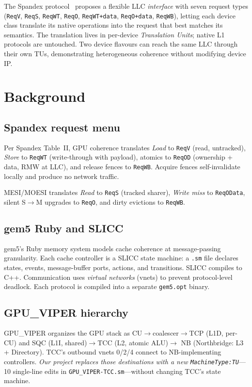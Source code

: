 \documentclass[conference,letterpaper,10pt]{IEEEtran}
\begin{document}
The Spandex protocol~\cite{spandex} proposes a flexible LLC
\emph{interface} with seven request types (\texttt{ReqV}, \texttt{ReqS},
\texttt{ReqWT}, \texttt{ReqO}, \texttt{ReqWT+data}, \texttt{ReqO+data},
\texttt{ReqWB}), letting each device class translate its native
operations into the request that best matches its semantics. The
translation lives in per-device \emph{Translation Units}; native L1
protocols are untouched. Two device flavours can reach the same LLC
through their own TUs, demonstrating heterogeneous coherence without
modifying device IP.

\section{Background}

\subsection{Spandex request menu}
Per Spandex Table~II, GPU coherence translates \emph{Load} to
\texttt{ReqV} (read, untracked), \emph{Store} to \texttt{ReqWT}
(write-through with payload), atomics to \texttt{ReqOD} (ownership +
data, RMW at LLC), and release fences to \texttt{ReqWB}. Acquire
fences self-invalidate locally and produce no network traffic.

MESI/MOESI translates \emph{Read} to \texttt{ReqS} (tracked sharer),
\emph{Write miss} to \texttt{ReqOData}, silent S$\to$M upgrades to
\texttt{ReqO}, and dirty evictions to \texttt{ReqWB}.

\subsection{gem5 Ruby and SLICC}
gem5's Ruby memory system models cache coherence at message-passing
granularity. Each cache controller is a SLICC state machine: a
\texttt{.sm} file declares states, events, message-buffer ports,
actions, and transitions. SLICC compiles to C++. Communication uses
\emph{virtual networks} (vnets) to prevent protocol-level deadlock.
Each protocol is compiled into a separate \texttt{gem5.opt} binary.

\subsection{GPU\_VIPER hierarchy}
GPU\_VIPER organizes the GPU stack as
\textsc{CU}$\to$coalescer$\to$\textsc{TCP} (L1D, per-CU) and
\textsc{SQC} (L1I, shared)$\to$\textsc{TCC} (L2, atomic ALU)$\to$
\textsc{NB} (Northbridge: L3 + Directory). TCC's outbound vnets 0/2/4
connect to \textsc{NB}-implementing controllers. \emph{Our project
replaces those destinations with a new
\texttt{MachineType:TU}}---10 single-line edits in
\texttt{GPU\_VIPER-TCC.sm}---without changing TCC's state machine.
\end{document}
